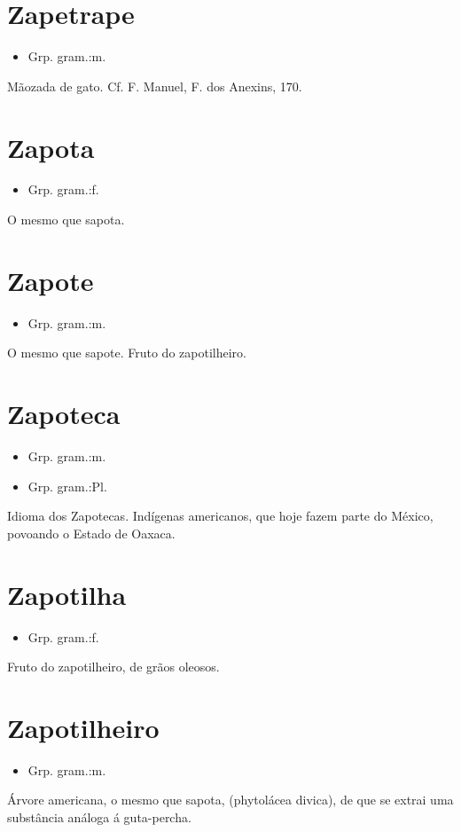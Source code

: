 \section{Zapetrape}
\begin{itemize}
\item {Grp. gram.:m.}
\end{itemize}
Mãozada de gato. Cf. F. Manuel, \textunderscore F. dos Anexins\textunderscore , 170.
\section{Zapota}
\begin{itemize}
\item {Grp. gram.:f.}
\end{itemize}
O mesmo que \textunderscore sapota\textunderscore .
\section{Zapote}
\begin{itemize}
\item {Grp. gram.:m.}
\end{itemize}
O mesmo que \textunderscore sapote\textunderscore .
Fruto do zapotilheiro.
\section{Zapoteca}
\begin{itemize}
\item {Grp. gram.:m.}
\end{itemize}
\begin{itemize}
\item {Grp. gram.:Pl.}
\end{itemize}
Idioma dos Zapotecas.
Indígenas americanos, que hoje fazem parte do México, povoando o Estado de Oaxaca.
\section{Zapotilha}
\begin{itemize}
\item {Grp. gram.:f.}
\end{itemize}
Fruto do zapotilheiro, de grãos oleosos.
\section{Zapotilheiro}
\begin{itemize}
\item {Grp. gram.:m.}
\end{itemize}
Árvore americana, o mesmo que \textunderscore sapota\textunderscore , (\textunderscore phytolácea divica\textunderscore ), de que se extrai uma substância análoga á guta-percha.
